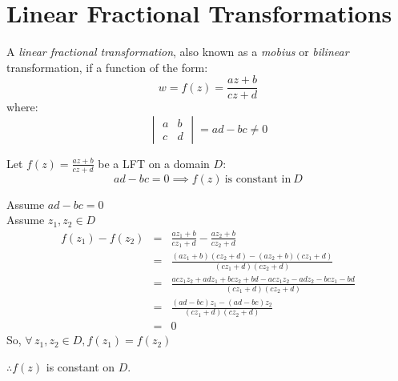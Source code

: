 \documentclass[letterpaper,12pt,fleqn]{article}
\begin{document}
\section*{Linear Fractional Transformations}

\begin{definition}
  A \emph{linear fractional transformation}, also known as a \emph{mobius} or
  \emph{bilinear} transformation, if a function of the form:
  \[w=f(z)=\frac{az+b}{cz+d}\]
  where:
  \[\begin{vmatrix} a & b \\ c & d \end{vmatrix}=ad-bc\ne0\]
\end{definition}

\begin{theorem}
  Let $f(z)=\frac{az+b}{cz+d}$ be a LFT on a domain $D$:
  \[ad-bc=0\implies f(z)\ \mbox{is constant in}\ D\]
\end{theorem}

\begin{theproof}
  Assume $ad-bc=0$ \\
  Assume $z_1,z_2\in D$ \\
  \begin{eqnarray*}
    f(z_1)-f(z_2) &=& \frac{az_1+b}{cz_1+d}-\frac{az_2+b}{cz_2+d} \\
    &=& \frac{(az_1+b)(cz_2+d)-(az_2+b)(cz_1+d)}{(cz_1+d)(cz_2+d)} \\
    &=& \frac{acz_1z_2+adz_1+bcz_2+bd-acz_1z_2-adz_2-bcz_1-bd}
    {(cz_1+d)(cz_2+d)} \\
    &=& \frac{(ad-bc)z_1-(ad-bc)z_2}{(cz_1+d)(cz_2+d)} \\
    &=& 0
  \end{eqnarray*}
  So, $\forall\,z_1,z_2\in D,f(z_1)=f(z_2)$

  $\therefore f(z)$ is constant on $D$.
\end{theproof}
\end{document}
